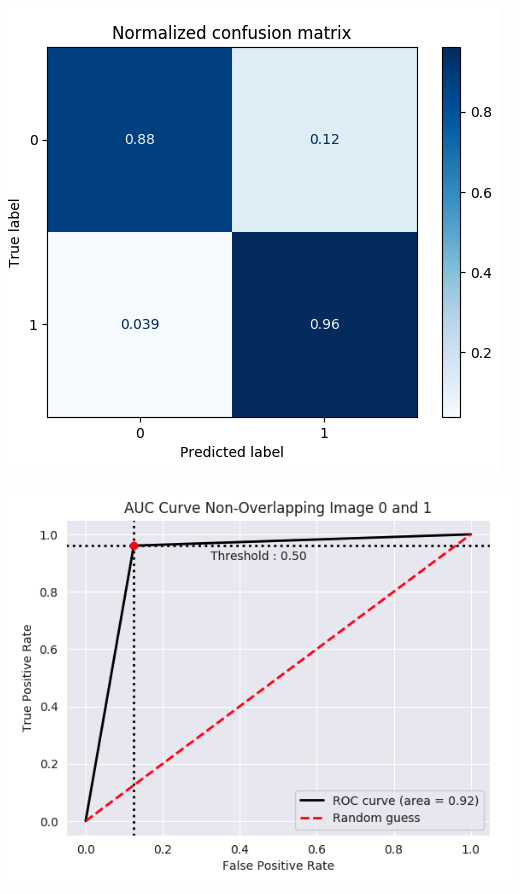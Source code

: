 \documentclass[12pt]{article}
\begin{document}
\begin{multicols*}{2}
\begin{center}
	\includegraphics[scale=0.3]{../screenshot/Non-Overlapping/cf01.png}

	\includegraphics[scale=0.3]{../screenshot/Non-Overlapping/roc01.png}
  \end{center}



\end{multicols*}
\end{document}
